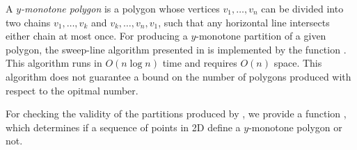A {\em $y$-monotone polygon}
is a polygon whose vertices $v_1, \ldots, v_n$ can be divided into two chains 
$v_1, \ldots, v_k$ and $v_k, \ldots, v_n, v_1$, such that any horizontal line 
intersects either chain at most once.  For producing a $y$-monotone partition 
of a given polygon, the sweep-line algorithm 
presented in \cite{bkos-cgaa-97} is implemented by the function
.  
This algorithm runs in $O(n \log n)$ time and requires $O(n)$ space.
This algorithm does not guarantee a bound on the number of polygons 
produced with respect to the opitmal number.

For checking the validity of the partitions produced by 
, we provide a function , 
which determines if a sequence of points in 2D define a $y$-monotone
polygon or not.
